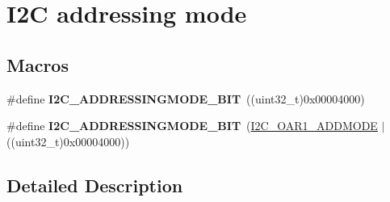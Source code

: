 \hypertarget{group___i2_c__addressing__mode}{\section{I2\-C addressing mode}
\label{group___i2_c__addressing__mode}
}
\subsection*{Macros}
\begin{DoxyCompactItemize}
\item 
\hypertarget{group___i2_c__addressing__mode_ga28cf3b277595ac15edf383c2574ed18d}{\#define {\bfseries I2\-C\-\_\-\-A\-D\-D\-R\-E\-S\-S\-I\-N\-G\-M\-O\-D\-E\-\_\-B\-I\-T}~((uint32\-\_\-t)0x00004000)}\label{group___i2_c__addressing__mode_ga28cf3b277595ac15edf383c2574ed18d}

\item 
\hypertarget{group___i2_c__addressing__mode_ga2401dc32e64cd53290497bab73c3608d}{\#define {\bfseries I2\-C\-\_\-\-A\-D\-D\-R\-E\-S\-S\-I\-N\-G\-M\-O\-D\-E\-\_\-B\-I\-T}~(\hyperlink{group___peripheral___registers___bits___definition_ga7d8df80cd27313c896e887aae81fa639}{I2\-C\-\_\-\-O\-A\-R1\-\_\-\-A\-D\-D\-M\-O\-D\-E} $\vert$ ((uint32\-\_\-t)0x00004000))}\label{group___i2_c__addressing__mode_ga2401dc32e64cd53290497bab73c3608d}

\end{DoxyCompactItemize}


\subsection{Detailed Description}
